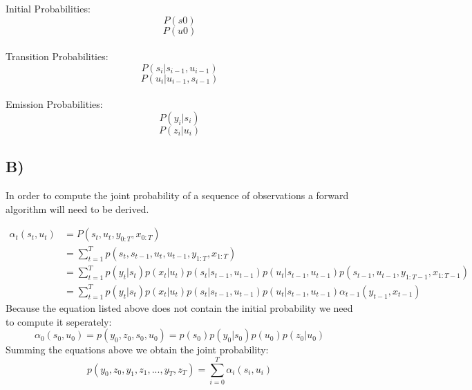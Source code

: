\documentclass{report}
\begin{document}
Initial Probabilities:
\begin{equation}
  P(s0)
\end{equation}
\begin{equation}
  P(u0)
\end{equation}\\

Transition Probabilities:
\begin{equation}
  P(s_i | s_{i-1}, u_{i-1})
\end{equation}
\begin{equation}
  P(u_i | u_{i-1}, s_{i-1})
\end{equation}\\

Emission Probabilities:
\begin{equation}
  P(y_i | s_i)
\end{equation}
\begin{equation}
  P(z_i | u_i)
\end{equation}

\subsection*{B)}
In order to compute the joint probability of a sequence of observations a
forward algorithm will need to be derived.

\begin{equation}
  \begin{aligned}
  \alpha_t(s_t, u_t) & = P(s_t, u_t, y_{0:T}, x_{0:T})\\
   & = \sum_{t = 1}^T p(s_t, s_{t-1}, u_t, u_{t-1}, y_{1:T}, x_{1:T})\\
   & = \sum_{t = 1}^T p(y_t | s_t) p(x_t | u_t) p(s_t | s_{t-1}, u_{t-1}) p(u_t | s_{t-1}, u_{t-1}) p(s_{t-1}, u_{t-1}, y_{1:T-1}, x_{1:T-1})\\
   & = \sum_{t = 1}^T p(y_t | s_t) p(x_t | u_t) p(s_t | s_{t-1}, u_{t-1}) p(u_t | s_{t-1}, u_{t-1}) \alpha_{t-1}(y_{t-1}, x_{t-1})
  \end{aligned}
\end{equation}
Because the equation listed above does not contain the initial probability we
need to compute it seperately:
\begin{equation}
  \alpha_0 (s_0, u_0) = p(y_0, z_0, s_0, u_0) = p(s_0) p(y_0 | s_0) p(u_0) p(z_0 | u_0)
\end{equation}
Summing the equations above we obtain the joint probability:
\begin{equation}
  p(y_0, z_0, y_1, z_1, ... , y_T, z_T) = \sum_{i=0}^T \alpha_i(s_i, u_i)
\end{equation}
\end{document}
